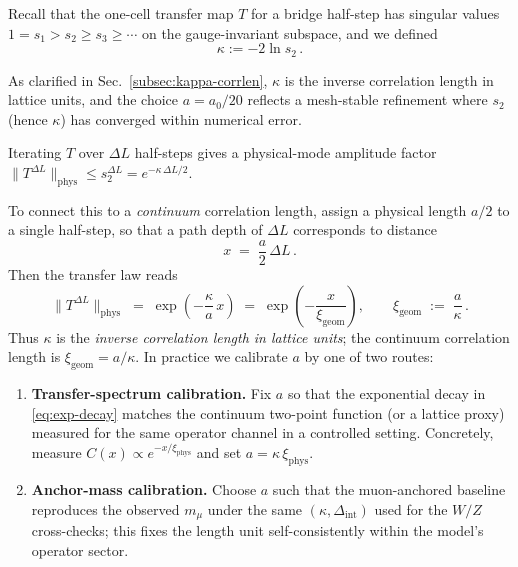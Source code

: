 \documentclass[11pt]{article}
\theoremstyle{plain}
\theoremstyle{definition}
\begin{document}
Recall that the one-cell transfer map $T$ for a bridge half-step has singular values $1=s_1>s_2\ge s_3\ge\cdots$ on the gauge-invariant subspace, and we defined
\begin{equation}\label{eq:kappa-def}
  \kappa := -2\ln s_2 \,.
\end{equation}

As clarified in Sec.~\ref{subsec:kappa-corrlen}, $\kappa$ is the inverse correlation length in lattice units, and the choice $a=a_0/20$ reflects a mesh-stable refinement where $s_2$ (hence $\kappa$) has converged within numerical error.

Iterating $T$ over $\Delta L$ half-steps gives a physical-mode amplitude factor $\|T^{\Delta L}\|_{\mathrm{phys}} \le s_2^{\Delta L} = e^{-\kappa\,\Delta L/2}$.

To connect this to a \emph{continuum} correlation length, assign a physical length $a/2$ to a single half-step, so that a path depth of $\Delta L$ corresponds to distance
\begin{equation}
  x \;=\; \frac{a}{2}\,\Delta L \,.
\end{equation}
Then the transfer law reads
\begin{equation}\label{eq:exp-decay}
  \|T^{\Delta L}\|_{\mathrm{phys}} \;=\; \exp\!\left(-\frac{\kappa}{a}\,x\right) \;=\; \exp\!\left(-\frac{x}{\xi_{\mathrm{geom}}}\right),\qquad
  \xi_{\mathrm{geom}} \;:=\; \frac{a}{\kappa}\,.
\end{equation}
Thus $\kappa$ is the \emph{inverse correlation length in lattice units}; the continuum correlation length is $\xi_{\mathrm{geom}}=a/\kappa$. In practice we calibrate $a$ by one of two routes:

\begin{enumerate}[label=(\alph*)]
  \item \textbf{Transfer-spectrum calibration.} Fix $a$ so that the exponential decay in \eqref{eq:exp-decay} matches the continuum two-point function (or a lattice proxy) measured for the same operator channel in a controlled setting. Concretely, measure $C(x)\propto e^{-x/\xi_{\mathrm{phys}}}$ and set $a=\kappa\,\xi_{\mathrm{phys}}$.

  \item \textbf{Anchor-mass calibration.} Choose $a$ such that the muon-anchored baseline reproduces the observed $m_\mu$ under the same $(\kappa,\Delta_{\mathrm{int}})$ used for the $W/Z$ cross-checks; this fixes the length unit self-consistently within the model’s operator sector.
\end{enumerate}
\end{document}
